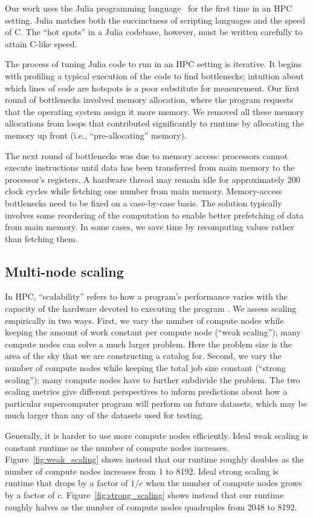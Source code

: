 Our work uses the Julia programming language~\citep{bezanson2017julia} for the first time in an HPC setting.
Julia matches both the succinctness of scripting languages and the speed of C.
The ``hot spots'' in a Julia codebase, however, must be written carefully to attain C-like speed.

The process of tuning Julia code to run in an HPC setting is iterative.
It begins with profiling a typical execution of the code to find bottlenecks;
intuition about which lines of code are hotspots is a poor substitute for measurement.
Our first round of bottlenecks involved memory allocation, where the program requests that the operating system assign it more memory. We removed all these memory allocations from loops that contributed significantly to runtime by allocating the memory up front (i.e., ``pre-allocating'' memory).

The next round of bottlenecks was due to memory access: processors cannot execute instructions until data has been transferred from main memory to the processor's registers. A hardware thread may remain idle for approximately 200 clock cycles while fetching one number from main memory.
Memory-access bottlenecks need to be fixed on a case-by-case basis. The solution typically involves some reordering of the computation to enable better prefetching of data from main memory. In some cases, we save time by recomputing values rather than fetching them.


\subsection{Multi-node scaling}
In HPC, ``scalability'' refers to how a program's performance varies with the capacity of the hardware devoted to executing the program \citep{hager2010introduction}.
We assess scaling empirically in two ways.
First, we vary the number of compute nodes while keeping the amount of work constant per compute node (``weak scaling''); many compute nodes can solve a much larger problem.
Here the problem size is the area of the sky that we are constructing a catalog for.
Second, we vary the number of compute nodes while keeping the total job size constant (``strong scaling''); many compute nodes have to further subdivide the problem.
The two scaling metrics give different perspectives to inform predictions about how a particular supercomputer program will perform on future datasets, which may be much larger than any of the datasets used for testing.

Generally, it is harder to use more compute nodes efficiently. Ideal weak scaling is constant runtime as the number of compute nodes increases. Figure~\ref{fig:weak_scaling} shows instead that our runtime roughly doubles as the number of compute nodes increases from 1 to 8192. Ideal strong scaling is runtime that
drops by a factor of $1/c$ when the number of compute nodes grows by a factor of $c$.
Figure~\ref{fig:strong_scaling} shows instead that our runtime roughly halves as the number of compute nodes quadruples from 2048 to 8192.

